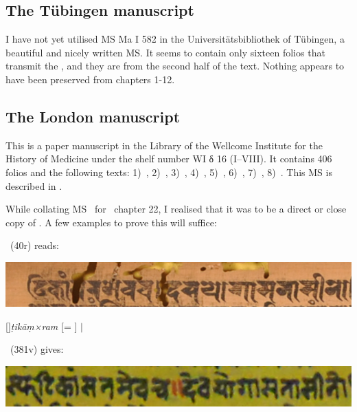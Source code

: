 \medskip
\subsection{The Tübingen manuscript}

I have not yet utilised MS Ma I 582 in the Universitätsbibliothek of
Tübingen, a beautiful and nicely written MS. It seems to contain only sixteen folios that transmit the \VSS, and they are from the
second half of the text. Nothing appears to have been preserved
from chapters 1-12.



\medskip
\subsection{The London manuscript}

This is a paper manuscript in the
Library of the Wellcome Institute for the History of Medicine
under the shelf number WI δ 16 (I--VIII). 
It contains 406 folios and the following texts: 
1)~, 
2)~,
3)~, 
4)~, 
5)~,
6)~,
7)~,
8)~.
This MS is described in .

While collating MS \msL\ for \VSS\ chapter 22, 
I realised that it was to be a direct or close copy of \msNa. 
A few examples to prove this will suffice:

\msNa\ (\fol40r) reads: 
\smallskip

\includegraphics[scale=.3]{images/dasayoga_msNa.png}

\smallskip

\hspace{2em}[]\textit{ṭikāṃ×ram} [= ]  $|$ 

\medskip

\msL\ (\fol381v) gives:
\smallskip

\includegraphics[scale=.3]{images/dasayoga_msL.png}
\smallskip

